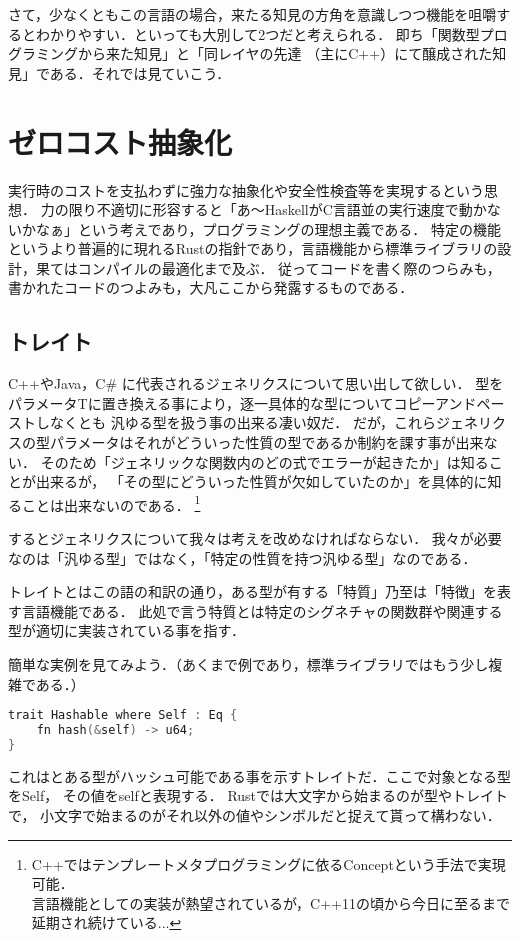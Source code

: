 さて，少なくともこの言語の場合，来たる知見の方角を意識しつつ機能を咀嚼するとわかりやすい．といっても大別して2つだと考えられる．
即ち「関数型プログラミングから来た知見」と「同レイヤの先達 （主にC++）にて醸成された知見」である．それでは見ていこう．

\section{ゼロコスト抽象化}
実行時のコストを支払わずに強力な抽象化や安全性検査等を実現するという思想．
力の限り不適切に形容すると「あ〜HaskellがC言語並の実行速度で動かないかなぁ」という考えであり，プログラミングの理想主義である．
特定の機能というより普遍的に現れるRustの指針であり，言語機能から標準ライブラリの設計，果てはコンパイルの最適化まで及ぶ．
従ってコードを書く際のつらみも，書かれたコードのつよみも，大凡ここから発露するものである．

\subsection{トレイト}
C++やJava，C\# に代表されるジェネリクスについて思い出して欲しい．
型をパラメータTに置き換える事により，逐一具体的な型についてコピーアンドペーストしなくとも
汎ゆる型を扱う事の出来る凄い奴だ．
だが，これらジェネリクスの型パラメータはそれがどういった性質の型であるか制約を課す事が出来ない．
そのため「ジェネリックな関数内のどの式でエラーが起きたか」は知ることが出来るが，
「その型にどういった性質が欠如していたのか」を具体的に知ることは出来ないのである．
\footnote{C++ではテンプレートメタプログラミングに依るConceptという手法で実現可能．
  \\ 言語機能としての実装が熱望されているが，C++11の頃から今日に至るまで延期され続けている...}

するとジェネリクスについて我々は考えを改めなければならない．
我々が必要なのは「汎ゆる型」ではなく，「特定の性質を持つ汎ゆる型」なのである．

トレイトとはこの語の和訳の通り，ある型が有する「特質」乃至は「特徴」を表す言語機能である．
此処で言う特質とは特定のシグネチャの関数群や関連する型が適切に実装されている事を指す．

簡単な実例を見てみよう．（あくまで例であり，標準ライブラリではもう少し複
雑である．）
\begin{lstlisting}[language={C++},caption=Hash可能である事を示すトレイト,label=hash_t]
trait Hashable where Self : Eq {
    fn hash(&self) -> u64;
}
\end{lstlisting}
これはとある型がハッシュ可能である事を示すトレイトだ．ここで対象となる型をSelf，
その値をselfと表現する．
Rustでは大文字から始まるのが型やトレイトで，
小文字で始まるのがそれ以外の値やシンボルだと捉えて貰って構わない．

